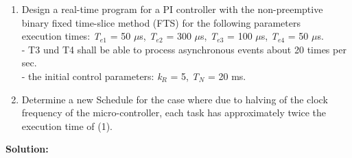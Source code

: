 \begin{enumerate}
\item Design a real-time program for a PI controller with the non-preemptive binary fixed time-slice method (FTS) for the following parameters \\ execution times: \textit{T}${}_{e1}$ = 50 $\mu$s, \textit{T}${}_{e2}$ = 300 $\mu$s, \textit{T}${}_{e3}$ = 100 $\mu$s, \textit{T}${}_{e4}$ = 50 $\mu$s.\\ - T3 und T4 shall be able to process asynchronous events about 20 times per sec.\\- the initial control parameters: \textit{k${}_{R}$} = 5, \textit{T${}_{N}$} = 20 ms.
\item Determine a new Schedule for the case where due to halving of the clock frequency of the micro-controller, each task has approximately twice the execution time of (1).
\end{enumerate}

\textbf{Solution:}


